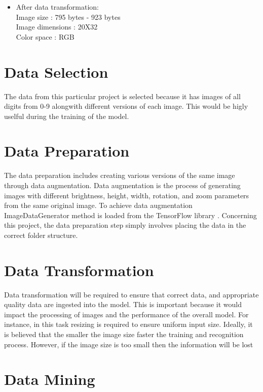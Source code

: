 \begin{itemize}
	\item After data transformation:\\
	Image size : 795 bytes - 923 bytes\\
	Image dimensions : 20X32\\
	Color space : RGB
\end{itemize}

\section{Data Selection}
The data from this particular project is selected because it has images of all digits from 0-9 alongwith different versions of each image. This would be higly uselful during the training of the model.

\section{Data Preparation}

The data preparation includes creating various versions of the same image through data augmentation. Data augmentation is the process of generating images with different brightness, height, width, rotation, and zoom parameters from the same original image. To achieve data augmentation ImageDataGenerator method is loaded from the TensorFlow library \cite{Mueller:2021Part1}. Concerning this project, the data preparation step simply involves placing the data in the correct folder structure.

\section{Data Transformation}
Data transformation will be required to ensure that correct data, and appropriate quality data are ingested into the model. This is important because it would impact the processing of images and the performance of the overall model. For instance, in this task resizing is required to ensure uniform input size. Ideally, it is believed that the smaller the image size faster the training and recognition process. However, if the image size is too small then the information will be lost \cite{Mueller:2021Part1}

\section{Data Mining}


